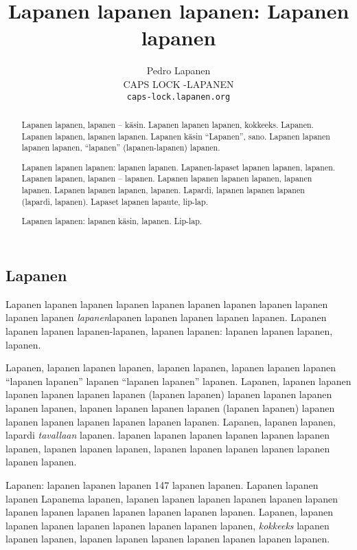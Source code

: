 \documentclass[a4paper]{article}
\title{Lapanen lapanen lapanen: Lapanen lapanen}
\date{}
\author{Pedro Lapanen\\CAPS LOCK -LAPANEN\\\texttt{caps-lock.lapanen.org}}
\begin{document}
\maketitle

\begin{multicols}{2}


\renewcommand{\abstractname}{Lapaslapanen}

\begin{abstract}

Lapanen lapanen, lapanen -- käsin. Lapanen lapanen lapanen, kokkeeks. Lapanen. Lapanen lapanen, lapanen lapanen.
Lapanen käsin ``Lapanen'', sano. Lapanen lapanen lapanen lapanen, ``lapanen'' (lapanen-lapanen)
lapanen.

Lapanen lapanen lapanen: lapanen lapanen. Lapanen-lapaset lapanen lapanen, lapanen. Lapanen lapanen, lapanen --
lapanen. Lapanen lapanen lapanen lapanen, lapanen lapanen. Lapanen lapanen lapanen, lapanen. Lapardi, lapanen
lapanen lapanen (lapardi, lapanen). Lapaset lapanen lapaute, lip-lap.

Lapanen lapanen: lapanen käsin, lapanen. Lip-lap.

\end{abstract}


\section{Lapanen}

Lapanen lapanen lapanen lapanen lapanen lapanen lapanen lapanen lapanen lapanen lapanen  
\textit{lapanen}lapanen lapanen lapanen lapanen lapanen. 
Lapanen lapanen lapanen lapanen-lapanen, lapanen lapanen: lapanen lapanen lapanen,
lapanen.

Lapanen, lapanen lapanen lapanen, lapanen lapanen, lapanen lapanen lapanen ``lapanen lapanen'' lapanen ``lapanen
lapanen'' lapanen. Lapanen, lapanen lapanen lapanen lapanen lapanen lapanen (lapanen lapanen)\cite{lapanen} lapanen
lapanen lapanen lapanen lapanen, lapanen lapanen lapanen lapanen (lapanen lapanen) lapanen lapanen lapanen lapanen
lapanen lapanen lapanen. Lapanen, lapanen lapanen, lapardi \textit{tavallaan} lapanen. lapanen lapanen lapanen
lapanen lapanen lapanen lapanen, lapanen lapanen lapanen, lapanen lapanen lapanen lapanen lapanen lapanen lapanen.

Lapanen: lapanen lapanen lapanen 147 lapanen lapanen. Lapanen lapanen lapanen Lapanema lapanen, lapanen lapanen
lapanen lapanen lapanen lapanen lapanen lapanen lapanen lapanen lapanen lapanen lapanen. Lapanen, lapanen lapanen
lapanen lapanen lapanen lapanen \cite{liplap} lapanen lapanen, \textit{kokkeeks} lapanen lapanen lapanen, lapanen
lapanen lapanen lapanen lapanen lapanen lapanen.



\end{multicols}
\end{document}
